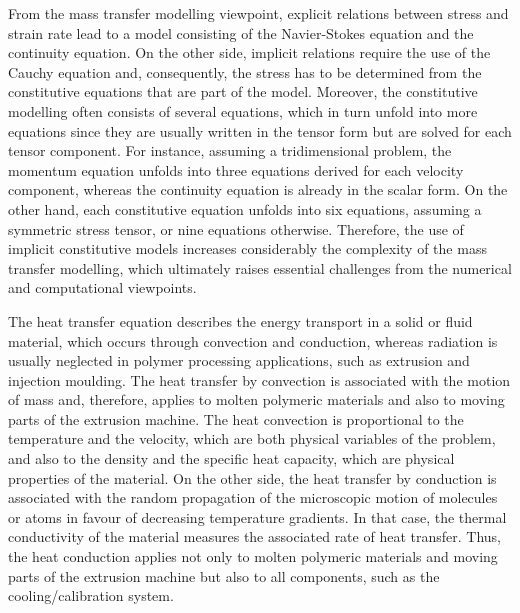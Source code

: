 From the mass transfer modelling viewpoint, explicit relations between stress and strain rate lead to a model consisting of the Navier-Stokes equation and the continuity equation.
On the other side, implicit relations require the use of the Cauchy equation and, consequently, the stress has to be determined from the constitutive equations that are part of the model.
Moreover, the constitutive modelling often consists of several equations, which in turn unfold into more equations since they are usually written in the tensor form but are solved for each tensor component.
For instance, assuming a tridimensional problem, the momentum equation unfolds into three equations derived for each velocity component, whereas the continuity equation is already in the scalar form.
On the other hand, each constitutive equation unfolds into six equations, assuming a symmetric stress tensor, or nine equations otherwise.
Therefore, the use of implicit constitutive models increases considerably the complexity of the mass transfer modelling, which ultimately raises essential challenges from the numerical and computational viewpoints.

The heat transfer equation describes the energy transport in a solid or fluid material, which occurs through convection and conduction, whereas radiation is usually neglected in polymer processing applications, such as extrusion and injection moulding.
The heat transfer by convection is associated with the motion of mass and, therefore, applies to molten polymeric materials and also to moving parts of the extrusion machine.
The heat convection is proportional to the temperature and the velocity, which are both physical variables of the problem, and also to the density and the specific heat capacity, which are physical properties of the material.
On the other side, the heat transfer by conduction is associated with the random propagation of the microscopic motion of molecules or atoms in favour of decreasing temperature gradients.
In that case, the thermal conductivity of the material measures the associated rate of heat transfer.
Thus, the heat conduction applies not only to molten polymeric materials and moving parts of the extrusion machine but also to all components, such as the cooling/calibration system.

